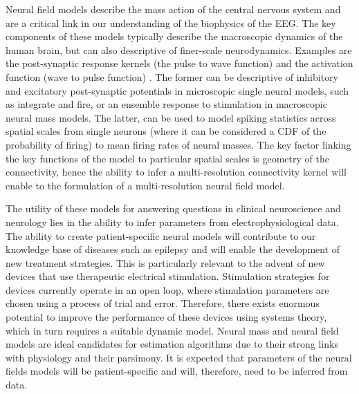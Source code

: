 \documentclass[review,authoryear,3p]{elsarticle}
\begin{document}
Neural field models describe the mass action of the central nervous system and are a critical link in our understanding of the biophysics of the EEG. The key components of these models typically describe the macroscopic dynamics of the human brain, but can also descriptive of finer-scale neurodynamics. Examples are the post-synaptic response kernels (the pulse to wave function) and the activation function (wave to pulse function) \citep{Jirsa1997}. The former can be descriptive of inhibitory and excitatory post-synaptic potentials in microscopic single neural models, such as integrate and fire, or an ensemble response to stimulation in macroscopic neural mass models. The latter, can be used to model spiking statistics across spatial scales from single neurons (where it can be considered a CDF of the probability of firing) to mean firing rates of neural masses. The key factor linking the key functions of the model to particular spatial scales is geometry of the connectivity, hence the ability to infer a multi-resolution connectivity kernel will enable to the formulation of a multi-resolution neural field model. 

The utility of these models for answering questions in clinical neuroscience and neurology lies in the ability to infer parameters from electrophysiological data. The ability to create patient-specific neural models will contribute to our knowledge base of diseases such as epilepsy and will enable the development of new treatment strategies. This is particularly relevant to the advent of new devices that use therapeutic electrical stimulation. Stimulation strategies for devices currently operate in an open loop, where stimulation parameters are chosen using a process of trial and error. Therefore, there exists enormous potential to improve the performance of these devices using systems theory, which in turn requires a suitable dynamic model. Neural mass and neural field models are ideal candidates for estimation algorithms due to their strong links with physiology and their parsimony. It is expected that parameters of the neural fields models will be patient-specific and will, therefore, need to be inferred from data.
\end{document}
